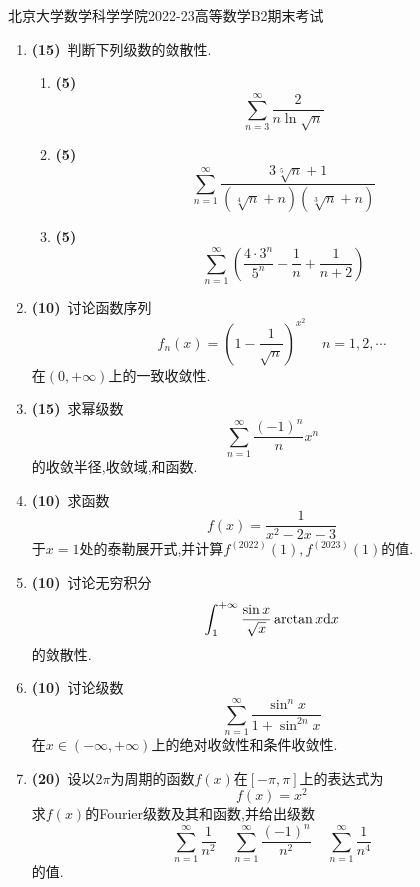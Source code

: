 \documentclass{ctexart}
\begin{document}
\pagestyle{empty}
\begin{center}\Large
    北京大学数学科学学院2022-23高等数学B2期末考试
\end{center}
\begin{enumerate}[leftmargin=*,label=\textbf{\arabic*.},topsep=0pt,parsep=0pt,itemsep=0pt,partopsep=0pt]
    \item \textbf{(15)}\ 判断下列级数的敛散性.
        \begin{enumerate}[label=\tbf{(\arabic*)},topsep=0pt,parsep=0pt,itemsep=0pt,partopsep=0pt]
            \item \textbf{(5)}
                \[\sum_{n=3}^{\infty}\dfrac{2}{n\ln\sqrt{n}}\]
            \item \textbf{(5)}
                \[\sum_{n=1}^{\infty}\dfrac{3\sqrt[5]{n}+1}{\left(\sqrt[4]{n}+n\right)\left(\sqrt[3]{n}+n\right)}\]
            \item \textbf{(5)}
                \[\sum_{n=1}^{\infty}\left(\dfrac{4\cdot3^n}{5^n}-\dfrac{1}{n}+\dfrac{1}{n+2}\right)\]
        \end{enumerate}

    \item \textbf{(10)}\ 讨论函数序列
        \[f_n(x)=\left(1-\dfrac{1}{\sqrt{n}}\right)^{x^2}\ \ \ \ \ n=1,2,\cdots\]
        在$(0,+\infty)$上的一致收敛性.

    \item \textbf{(15)}\ 求幂级数
        \[\sum_{n=1}^{\infty}\dfrac{(-1)^n}{n}x^n\]
        的收敛半径,收敛域,和函数.

    \item \textbf{(10)}\ 求函数
        \[f(x)=\dfrac{1}{x^2-2x-3}\]
        于$x=1$处的泰勒展开式,并计算$f^{(2022)}(1),f^{(2023)}(1)$的值.
        
    \item \textbf{(10)}\ 讨论无穷积分
        \[\int_1^{+\infty}\dfrac{\sin x}{\sqrt{x}}\arctan x\mathrm{d} x\]
        的敛散性.

    \item \textbf{(10)}\ 讨论级数
        \[\sum_{n=1}^{\infty}\dfrac{\sin^n x}{1+\sin^{2n}x}\]
        在$x\in(-\infty,+\infty)$上的绝对收敛性和条件收敛性.

    \item \textbf{(20)}\ 设以$2\pi$为周期的函数$f(x)$在$[-\pi,\pi]$上的表达式为
        \[f(x)=x^2\]
        求$f(x)$的Fourier级数及其和函数,并给出级数
        \[\sum_{n=1}^{\infty}\dfrac{1}{n^2}
        \ \ \ \ \ \sum_{n=1}^{\infty}\dfrac{(-1)^n}{n^2}
        \ \ \ \ \ \sum_{n=1}^{\infty}\dfrac{1}{n^4}\]
        的值.


\end{enumerate}
\end{document}
